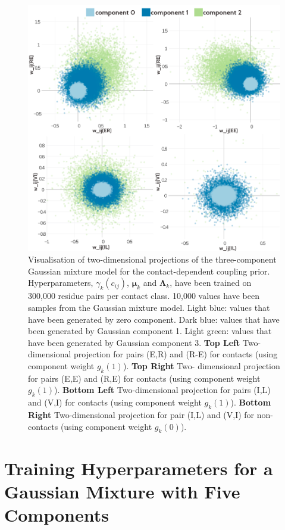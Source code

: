 \documentclass[11pt,a4paper,twoside]{book}
\newcommand{\Lk}{\mathbf{\Lambda}_k}
\newcommand{\muk}{\mathbf{\mu}_k}
\newcommand{\cij}{c_{ij}}
\theoremstyle{definition}
\theoremstyle{definition}
\theoremstyle{remark}
\begin{document}
\begin{figure}
\includegraphics[width=1\linewidth]{img/bayesian_model/pll/3/2dvis_combined_300k} \caption{Visualisation of two-dimensional
projections of the three-component Gaussian mixture model for the
contact-dependent coupling prior. Hyperparameters, \(\gamma_k(\cij)\),
\(\muk\) and \(\Lk\), have been trained on 300,000 residue pairs per
contact class. 10,000 values have been samples from the Gaussian mixture
model. Light blue: values that have been generated by zero component.
Dark blue: values that have been generated by Gaussian component 1.
Light green: values that have been generated by Gaussian component 3.
\textbf{Top Left} Two-dimensional projection for pairs (E,R) and (R-E)
for contacts (using component weight \(g_k(1)\)). \textbf{Top Right}
Two- dimensional projection for pairs (E,E) and (R,E) for contacts
(using component weight \(g_k(1)\)). \textbf{Bottom Left}
Two-dimensional projection for pairs (I,L) and (V,I) for contacts (using
component weight \(g_k(1)\)). \textbf{Bottom Right} Two-dimensional
projection for pair (I,L) and (V,I) for non-contacts (using component
weight \(g_k(0)\)).}\label{fig:vis2d-pll-3comp-300k}
\end{figure}

\section{Training Hyperparameters for a Gaussian Mixture with Five
Components}\label{training-hyperparameters-for-a-gaussian-mixture-with-five-components}
\end{document}
